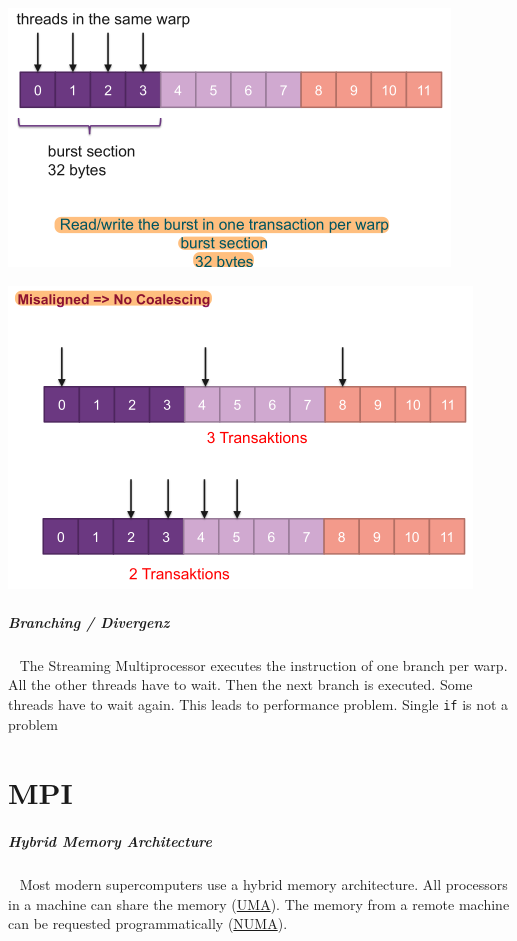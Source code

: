 \documentclass[8pt,twoside,landscape]{extarticle}
\begin{document}
\begin{multicols}{5}
{
\begin{center}
\includegraphics[width=.9\linewidth]{img/memory_coalescing.png}
\end{center}
\label{fig:memory-coalescing}
}

{
\begin{center}
\includegraphics[width=.9\linewidth]{img/no_memory_coalescing.png}
\end{center}
\label{fig:no-memory-coalescing}
}
\subparagraph{Branching / Divergenz} \
\label{sec:org46a0e38}
The Streaming Multiprocessor executes the instruction of one branch per warp.
All the other threads have to wait.
Then the next branch is executed.
Some threads have to wait again.
This leads to performance problem.
Single \texttt{if} is not a problem
\section{MPI}
\label{sec:orga09107b}
\subparagraph{Hybrid Memory Architecture} \
\label{sec:orgd054c8c}
Most modern supercomputers use a hybrid memory architecture.
All processors in a machine can share the memory (\href{../../../roam/20220524184828-uniform_memory_access.org}{UMA}).
The memory from a remote machine can be requested programmatically (\href{../../../roam/20220518180028-what_is_the_numa_model.org}{NUMA}).


\end{multicols}
\end{document}
